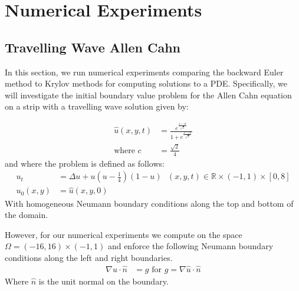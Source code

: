 \section{Numerical Experiments}

\subsection{Travelling Wave Allen Cahn}
In this section, we run numerical experiments comparing the backward Euler method to Krylov methods for computing solutions to a PDE.
Specifically, we will investigate the initial boundary value problem for the Allen Cahn equation on a strip with a travelling wave solution\cite{YukitakaFukao2004} given by:

\begin{align*}
    \hat u(x,y,t)&=\frac{e^{\frac{x-ct}{\sqrt2}}}{1+e^{\frac{x-ct}{\sqrt2}}} \label{TravellingWaveSol}\\
    \text{where } c &= \frac{\sqrt{2}}{4}
\end{align*}
and where the problem is defined as follows:
\begin{align*}
    u_t&=\Delta u+u(u-\frac14)(1-u) \text{ $(x,y,t)\in \mathbb{R} \times (-1,1) \times [0, 8]$}\\
    u_0(x, y) &= \hat u(x,y, 0)
\end{align*}
With homogeneous Neumann boundary conditions along the top and bottom of the domain.

However, for our numerical experiments we compute on the space $\Omega=(-16,16)\times(-1,1)$ and enforce the following Neumann boundary conditions along the left and right boundaries.
\begin{align*}
    \nabla u \cdot \hat n &= g \text{ for $g = \nabla \hat u \cdot \hat n$}
\end{align*}
Where $\hat n$ is the unit normal on the boundary.

